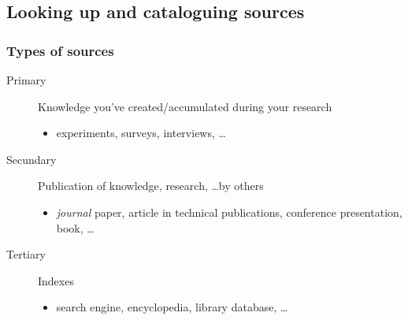 \documentclass{beamer}
\begin{document}
\subsection{Looking up and cataloguing sources}


\begin{frame}
  \frametitle{Types of sources}

  \begin{description}
    \item[Primary] Knowledge you've created/accumulated during your research
      \begin{itemize}
        \item experiments, surveys, interviews, \ldots
      \end{itemize}
    \item[Secundary] Publication of knowledge, research, \ldots by others
      \begin{itemize}
        \item \emph{journal} paper, article in technical publications, conference presentation, book, \ldots
      \end{itemize}
    \item[Tertiary] Indexes
      \begin{itemize}
        \item search engine, encyclopedia, library database, \ldots
      \end{itemize}
  \end{description}

\end{frame}
\end{document}
